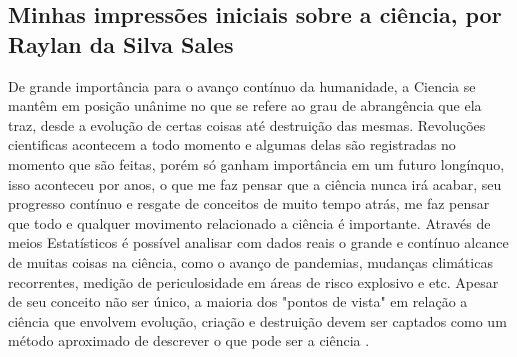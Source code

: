 \subsection{Minhas impressões iniciais sobre a ciência, por Raylan da Silva Sales}

De grande importância para o avanço contínuo da humanidade, a \gls{Ciencia} se mantêm em posição unânime no que se refere ao grau de abrangência que ela traz, desde a evolução de certas coisas até destruição das mesmas. Revoluções cientificas acontecem a todo momento e algumas delas são registradas no momento que são feitas, porém só ganham importância em um futuro longínquo, isso aconteceu por anos, o que me faz pensar que a ciência nunca irá acabar, seu progresso contínuo e resgate de conceitos de muito tempo atrás, me faz pensar que todo e qualquer movimento relacionado a ciência é importante. Através de meios \gls{Estatísticos} é possível analisar com dados reais o grande e contínuo alcance de muitas coisas na ciência, como o avanço de pandemias, mudanças climáticas recorrentes, medição de periculosidade em áreas de risco explosivo e etc. Apesar de seu conceito não ser único, a maioria dos "pontos de vista" em relação a ciência que envolvem evolução, criação e destruição devem ser captados como um método aproximado de descrever o que pode ser a ciência \citep{schwartzman_ciencia_1984}. 